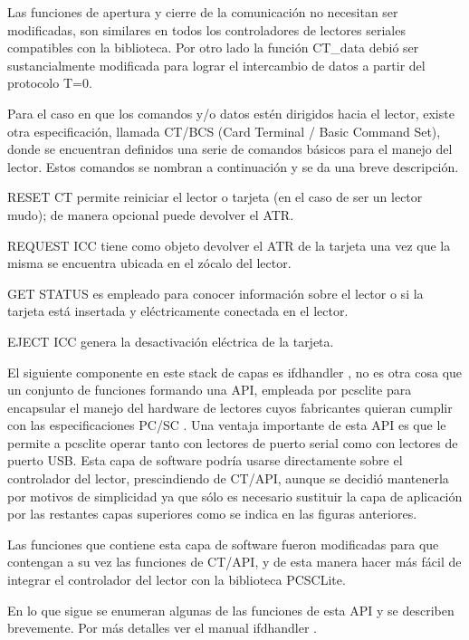 \bigskip
Las funciones de apertura y cierre de la comunicación no necesitan ser modificadas, son similares en todos 
los controladores de lectores seriales compatibles con la biblioteca. Por otro lado la función CT\_data debió ser sustancialmente modificada para lograr el intercambio de datos a partir del protocolo T=0.

\bigskip
Para el caso en que los comandos y/o datos estén dirigidos hacia el lector, existe otra especificación, llamada CT/BCS \cite{ctbcs} (Card Terminal / Basic Command Set), donde se encuentran definidos una serie de comandos básicos para el manejo del lector. Estos comandos se nombran a continuación y se da una breve descripción.

\bigskip
RESET CT permite reiniciar el lector o tarjeta (en el caso de ser un lector mudo); de manera opcional puede devolver el ATR.

REQUEST ICC tiene como objeto devolver el ATR de la tarjeta una vez que la misma se encuentra ubicada en el zócalo del lector.

GET STATUS es empleado para conocer información sobre el lector o si la tarjeta está insertada y eléctricamente conectada en el lector. 

EJECT ICC genera la desactivación eléctrica de la tarjeta.

\bigskip
{}
El siguiente componente en este stack de capas es ifdhandler \cite{ifdhandler}, no es otra cosa que un conjunto de funciones formando una API, empleada por pcsclite para encapsular el manejo del hardware de  lectores cuyos fabricantes quieran cumplir con las especificaciones PC/SC \cite{pcsclite_esp}. Una ventaja importante de esta API es que le permite a pcsclite operar tanto con lectores de puerto serial como con lectores de puerto USB.
Esta capa de software podría usarse directamente sobre el controlador del lector, prescindiendo de CT/API, aunque se decidió mantenerla por motivos de simplicidad ya que sólo es necesario sustituir la capa de aplicación por las restantes capas superiores como se indica en las figuras anteriores.

\bigskip
Las funciones que contiene esta capa de software fueron modificadas para que contengan a su vez las funciones de CT/API, y de esta manera hacer más fácil de integrar el controlador del lector con la biblioteca PCSCLite.

\bigskip
En lo que sigue se enumeran algunas de las funciones de esta API y se describen brevemente. Por más detalles ver el manual ifdhandler \cite{ifdhandler}.

